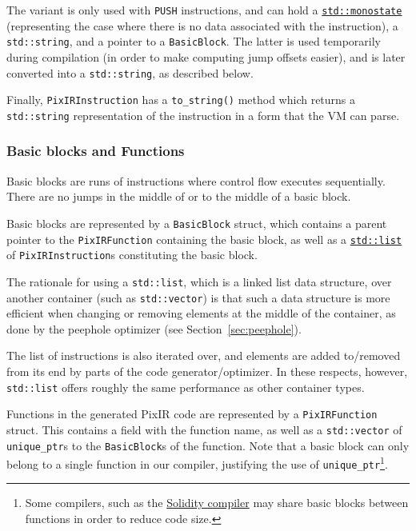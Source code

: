 \documentclass[11pt,a4paper]{scrartcl}
\begin{document}
The variant is only used with \verb|PUSH| instructions, and can hold a \href{https://en.cppreference.com/w/cpp/utility/variant/monostate}{\Verb|std::monostate|} (representing the case where there is no data associated with the instruction), a \verb|std::string|, and a pointer to a \verb|BasicBlock|. The latter is used temporarily during compilation (in order to make computing jump offsets easier), and is later converted into a \verb|std::string|, as described below.

Finally, \verb|PixIRInstruction| has a \verb|to_string()| method which returns a \verb|std::string| representation of the instruction in a form that the VM can parse.

\subsubsection{Basic blocks and Functions}

Basic blocks are runs of instructions where control flow executes sequentially. There are no jumps in the middle of or to the middle of a basic block.

Basic blocks are represented by a \verb|BasicBlock| struct, which contains a parent pointer to the \verb|PixIRFunction| containing the basic block, as well as a \href{https://en.cppreference.com/w/cpp/container/list}{\Verb|std::list|} of \verb|PixIRInstruction|s constituting the basic block.

The rationale for using a \verb|std::list|, which is a linked list data structure, over another container (such as \verb|std::vector|) is that such a data structure is more efficient when changing or removing elements at the middle of the container, as done by the peephole optimizer (see Section~\ref{sec:peephole}).

The list of instructions is also iterated over, and elements are added to/removed from its end by parts of the code generator/optimizer. In these respects, however, \verb|std::list| offers roughly the same performance as other container types.

Functions in the generated PixIR code are represented by a \verb|PixIRFunction| struct. This contains a field with the function name, as well as a \verb|std::vector| of \verb|unique_ptr|s to the \verb|BasicBlock|s of the function. Note that a basic block can only belong to a single function in our compiler, justifying the use of \verb|unique_ptr|\footnote{Some compilers, such as the \href{https://github.com/ethereum/solidity}{Solidity compiler} may share basic blocks between functions in order to reduce code size.}.
\end{document}
